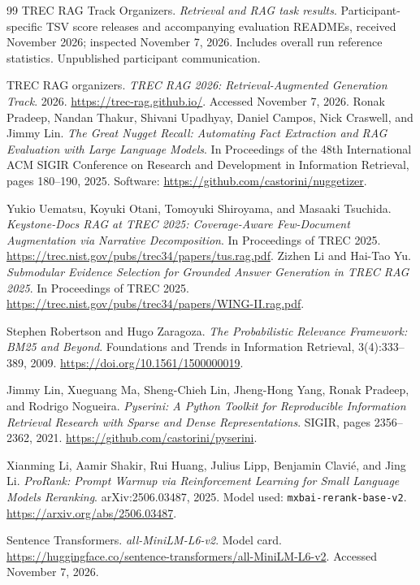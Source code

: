 \documentclass[11pt,letterpaper]{article}
\begin{document}
\begingroup\small
\begin{thebibliography}{99}
TREC RAG Track Organizers. \emph{Retrieval and RAG task results}. Participant-specific TSV score releases and accompanying evaluation READMEs, received November 2026; inspected November 7, 2026. Includes overall run reference statistics. Unpublished participant communication.

TREC RAG organizers. \emph{TREC RAG 2026: Retrieval-Augmented Generation Track}. 2026. \url{https://trec-rag.github.io/}. Accessed November 7, 2026.
Ronak Pradeep, Nandan Thakur, Shivani Upadhyay, Daniel Campos, Nick Craswell, and Jimmy Lin. \emph{The Great Nugget Recall: Automating Fact Extraction and RAG Evaluation with Large Language Models}. In Proceedings of the 48th International ACM SIGIR Conference on Research and Development in Information Retrieval, pages 180--190, 2025. Software: \url{https://github.com/castorini/nuggetizer}.

Yukio Uematsu, Koyuki Otani, Tomoyuki Shiroyama, and Masaaki Tsuchida. \emph{Keystone-Docs RAG at TREC 2025: Coverage-Aware Few-Document Augmentation via Narrative Decomposition}. In Proceedings of TREC 2025. \url{https://trec.nist.gov/pubs/trec34/papers/tus.rag.pdf}.
Zizhen Li and Hai-Tao Yu. \emph{Submodular Evidence Selection for Grounded Answer Generation in TREC RAG 2025}. In Proceedings of TREC 2025. \url{https://trec.nist.gov/pubs/trec34/papers/WING-II.rag.pdf}.

Stephen Robertson and Hugo Zaragoza. \emph{The Probabilistic Relevance Framework: BM25 and Beyond}. Foundations and Trends in Information Retrieval, 3(4):333--389, 2009. \url{https://doi.org/10.1561/1500000019}.

Jimmy Lin, Xueguang Ma, Sheng-Chieh Lin, Jheng-Hong Yang, Ronak Pradeep, and Rodrigo Nogueira. \emph{Pyserini: A Python Toolkit for Reproducible Information Retrieval Research with Sparse and Dense Representations}. SIGIR, pages 2356--2362, 2021. \url{https://github.com/castorini/pyserini}.

Xianming Li, Aamir Shakir, Rui Huang, Julius Lipp, Benjamin Clavi\'e, and Jing Li. \emph{ProRank: Prompt Warmup via Reinforcement Learning for Small Language Models Reranking}. arXiv:2506.03487, 2025. Model used: \texttt{mxbai-rerank-base-v2}. \url{https://arxiv.org/abs/2506.03487}.

Sentence Transformers. \emph{all-MiniLM-L6-v2}. Model card. \url{https://huggingface.co/sentence-transformers/all-MiniLM-L6-v2}. Accessed November 7, 2026.


\end{thebibliography}
\end{document}
